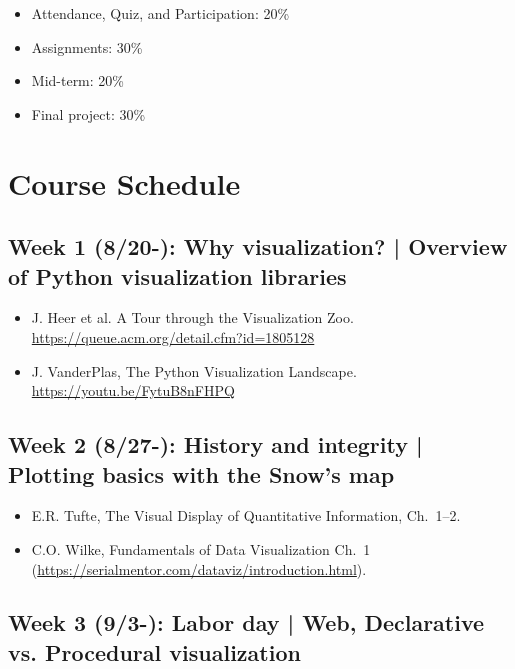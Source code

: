 \documentclass[11pt,article,oneside]{memoir} %
\begin{document}
\begin{itemize}%

\item Attendance, Quiz, and Participation: 20\%

\item Assignments: 30\%

\item Mid-term: 20\%

\item Final project: 30\%

\end{itemize}%
\section{Course Schedule}%



\subsection{Week 1 (8/20-): Why visualization? | Overview of Python visualization libraries}

\begin{itemize}\itemsep0em 
\item J. Heer et al. A Tour through the Visualization Zoo. \url{https://queue.acm.org/detail.cfm?id=1805128}
\item J. VanderPlas, The Python Visualization Landscape. \url{https://youtu.be/FytuB8nFHPQ}
\end{itemize}	

\subsection{Week 2 (8/27-): History and integrity | Plotting basics with the Snow's map }

\begin{itemize}\itemsep0em 
\item E.R. Tufte, The Visual Display of Quantitative Information, Ch.~1--2.
\item C.O. Wilke, Fundamentals of Data Visualization Ch.~1 (\url{https://serialmentor.com/dataviz/introduction.html}). 
\end{itemize}	

\subsection{Week 3 (9/3-): Labor day | Web, Declarative vs. Procedural visualization }
\end{document}
